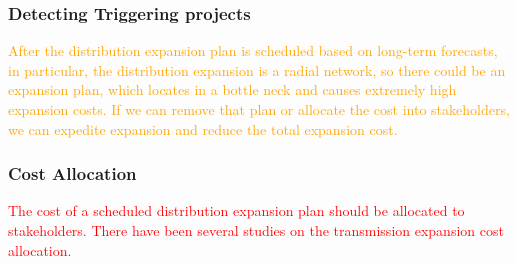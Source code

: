 \documentclass[journal]{IEEEtran} %
\begin{document}
\subsubsection{Detecting Triggering projects}
\textcolor{orange}{After the distribution expansion plan is scheduled based on long-term forecasts, in particular, the distribution expansion is a radial network, so there could be an expansion plan, which locates in a bottle neck and causes extremely high expansion costs. If we can remove that plan or allocate the cost into stakeholders, we can expedite expansion and reduce the total expansion cost. }





\vspace{1in}







\subsubsection{Cost Allocation}
\textcolor{red}{The cost of a scheduled distribution expansion plan should be allocated to stakeholders. There have been several studies on the transmission expansion cost allocation.}



\vspace{1in}








\end{document}
